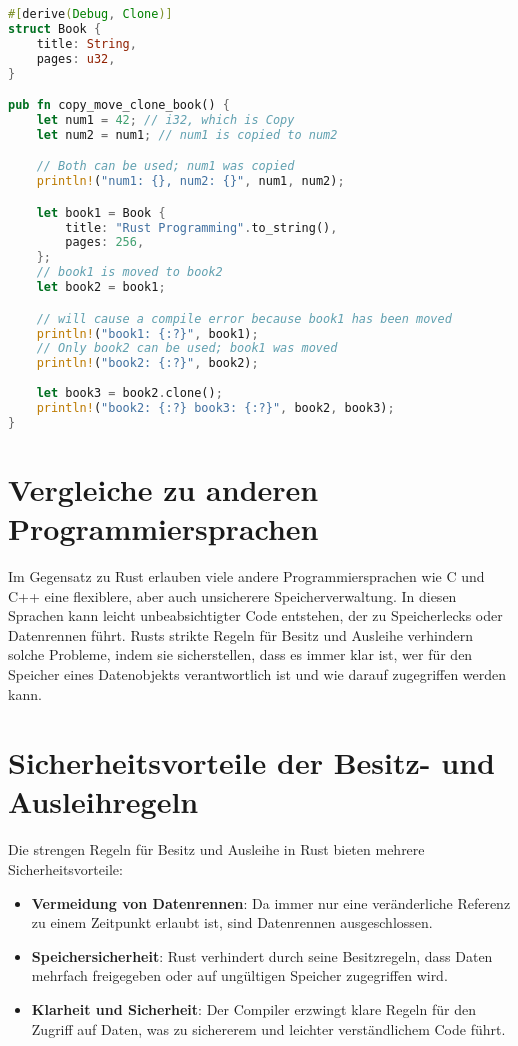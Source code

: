 \begin{lstlisting}[language=Rust, caption=Kopieren und Klonen von Strukturen]
#[derive(Debug, Clone)]
struct Book {
    title: String,
    pages: u32,
}

pub fn copy_move_clone_book() {
    let num1 = 42; // i32, which is Copy
    let num2 = num1; // num1 is copied to num2

    // Both can be used; num1 was copied
    println!("num1: {}, num2: {}", num1, num2); 

    let book1 = Book {
        title: "Rust Programming".to_string(),
        pages: 256,
    };
    // book1 is moved to book2
    let book2 = book1; 

    // will cause a compile error because book1 has been moved
    println!("book1: {:?}", book1); 
    // Only book2 can be used; book1 was moved
    println!("book2: {:?}", book2); 
                                    
    let book3 = book2.clone();
    println!("book2: {:?} book3: {:?}", book2, book3);
}
\end{lstlisting}

\section{Vergleiche zu anderen Programmiersprachen}

Im Gegensatz zu Rust erlauben viele andere Programmiersprachen wie C und C++ eine flexiblere, aber auch unsicherere Speicherverwaltung. In diesen Sprachen kann leicht unbeabsichtigter Code entstehen, der zu Speicherlecks oder Datenrennen führt. Rusts strikte Regeln für Besitz und Ausleihe verhindern solche Probleme, indem sie sicherstellen, dass es immer klar ist, wer für den Speicher eines Datenobjekts verantwortlich ist und wie darauf zugegriffen werden kann.

\section{Sicherheitsvorteile der Besitz- und Ausleihregeln}

Die strengen Regeln für Besitz und Ausleihe in Rust bieten mehrere Sicherheitsvorteile:

\begin{itemize}
    \item \textbf{Vermeidung von Datenrennen}: Da immer nur eine veränderliche Referenz zu einem Zeitpunkt erlaubt ist, sind Datenrennen ausgeschlossen.
    \item \textbf{Speichersicherheit}: Rust verhindert durch seine Besitzregeln, dass Daten mehrfach freigegeben oder auf ungültigen Speicher zugegriffen wird.
    \item \textbf{Klarheit und Sicherheit}: Der Compiler erzwingt klare Regeln für den Zugriff auf Daten, was zu sichererem und leichter verständlichem Code führt.
\end{itemize}
